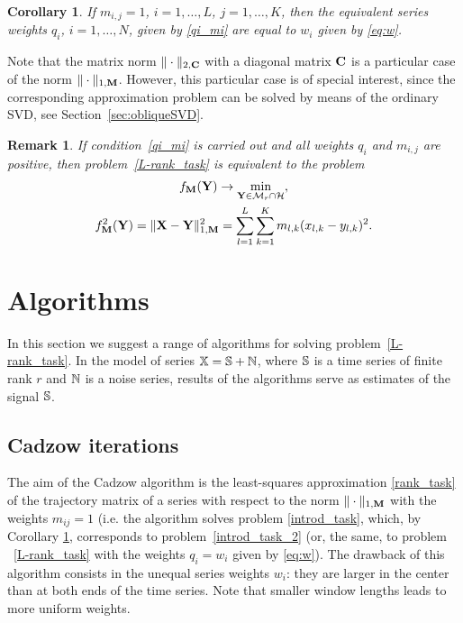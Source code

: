 \documentclass[sii]{ipart}
\newtheorem{corollary}{Corollary}
\newtheorem{remark}{Remark}
\begin{document}
\begin{corollary}
	\label{cor:base_weights}
	If $m_{i,j}=1$, $i =1, \ldots, L$, $j = 1, \ldots, K$, then the equivalent series weights $q_i$, $i = 1, \ldots, N$, given by \eqref{qi_mi} are equal to $w_i$ given by \eqref{eq:w}.
\end{corollary}

Note that the matrix norm $\|\cdot\|_{2, \mathbf{C}}$ with a diagonal matrix $\mathbf{C}$ is a particular case of the norm $\|\cdot\|_{1, \mathbf{M}}$.
However, this particular case is of special interest, since the corresponding approximation problem can be solved by means of the ordinary SVD, see Section~\ref{sec:obliqueSVD}.

\begin{remark}
	\label{rem:2tasks}
	If condition~\eqref{qi_mi} is carried out and all weights $q_i$ and $m_{i,j}$ are positive, then problem~\eqref{L-rank_task}
	is equivalent to the problem
	\begin{multline}
	\label{rank_task}
	f_\bfM(\bfY) \to \min_{\bfY \in \calM_r \cap \calH}, \\ f^2_\bfM(\bfY) = \|\bfX-\bfY\|^2_{1,\bfM} = \sum_{l = 1}^L \sum_{k=1}^K m_{l,k} (x_{l,k} - y_{l,k})^2.
	\end{multline}
\end{remark}

\section{Algorithms}
\label{sec:alg}
In this section we suggest a range of algorithms for solving problem~\eqref{L-rank_task}.
In the model of series $\mathbb{X}=\mathbb{S}+\mathbb{N}$, where $\mathbb{S}$ is a time series of finite rank $r$ and $\mathbb{N}$ is a noise series, results of the algorithms serve as  estimates of the signal $\mathbb{S}$.

\subsection{Cadzow iterations}
The aim of the Cadzow algorithm \cite{Cadzow1988} is the least-squares approximation \eqref{rank_task} of the trajectory matrix of a series with respect to the norm $\|\cdot\|_{1, \mathbf{M}}$ with the weights $m_{ij}=1$ (i.e. the algorithm solves problem \eqref{introd_task}, which, by Corollary \ref{cor:base_weights}, corresponds to problem~\eqref{introd_task_2} (or, the same, to problem ~\eqref{L-rank_task} with the weights $q_i=w_i$ given by \eqref{eq:w}). The drawback of this algorithm consists in the unequal series weights $w_i$: they are larger in the center than at both ends of the time series. Note that smaller window lengths leads to more uniform weights.
\end{document}
